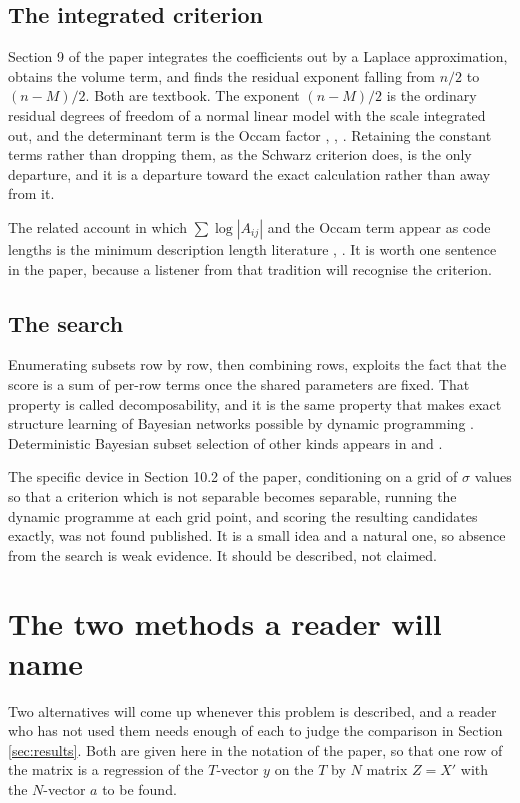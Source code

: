 \subsection{The integrated criterion}

Section 9 of the paper integrates the coefficients out by a Laplace approximation,
obtains the volume term, and finds the residual exponent falling from $n/2$ to
$(n-M)/2$. Both are textbook. The exponent $(n-M)/2$ is the ordinary residual
degrees of freedom of a normal linear model with the scale integrated out, and the
determinant term is the Occam factor \cite{schwarz1978}, \cite{mackay1992},
\cite{kass1995}. Retaining the constant terms rather than dropping them, as the
Schwarz criterion does, is the only departure, and it is a departure toward the
exact calculation rather than away from it.

The related account in which $\sum \log |A_{ij}|$ and the Occam term appear as code
lengths is the minimum description length literature \cite{wallace2005},
\cite{dhillon2011}. It is worth one sentence in the paper, because a listener from
that tradition will recognise the criterion.

\subsection{The search}

Enumerating subsets row by row, then combining rows, exploits the fact that the
score is a sum of per-row terms once the shared parameters are fixed. That property
is called decomposability, and it is the same property that makes exact structure
learning of Bayesian networks possible by dynamic programming \cite{silander2006}.
Deterministic Bayesian subset selection of other kinds appears in
\cite{jin2021} and \cite{kowal2022}.

The specific device in Section 10.2 of the paper, conditioning on a grid of
$\sigma$ values so that a criterion which is not separable becomes separable,
running the dynamic programme at each grid point, and scoring the resulting
candidates exactly, was not found published. It is a small idea and a natural one,
so absence from the search is weak evidence. It should be described, not claimed.

\section{The two methods a reader will name}

Two alternatives will come up whenever this problem is described, and a reader who
has not used them needs enough of each to judge the comparison in
Section \ref{sec:results}. Both are given here in the notation of the paper, so
that one row of the matrix is a regression of the $T$-vector $y$ on the $T$ by $N$
matrix $Z = X'$ with the $N$-vector $a$ to be found.

